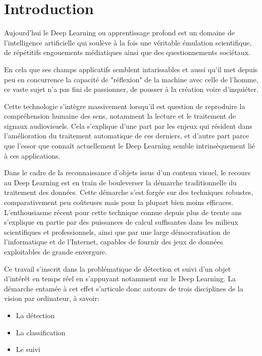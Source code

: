\section*{Introduction}
{}


	Aujourd’hui le Deep Learning ou apprentissage profond est un domaine de l’intelligence artificielle qui soulève à la fois une véritable émulation scientifique, de répétitifs engouements médiatiques \cite{Bib_mondepix} \cite{Bib_usinedigitale} \cite{Bib_silicon} ainsi que des questionnements sociétaux. 
	
	En cela que ses champs applicatifs semblent intarissables et aussi qu’il met depuis peu en concurrence la capacité de "réflexion" de la machine avec celle de l’homme, ce vaste sujet n’a pas fini de passionner, de pousser à la création voire d’inquiéter.  

	Cette technologie s’intègre massivement lorsqu’il est question de reproduire la compréhension humaine des sens, notamment la lecture et le traitement de signaux audiovisuels. Cela s’explique d’une part par les enjeux qui résident dans l’amélioration du traitement automatique de ces derniers, et d’autre part parce que l’essor que connaît actuellement le Deep Learning semble intrinsèquement lié à ces applications. 

	Dans le cadre de la reconnaissance d’objets issus d’un contenu visuel, le recours au Deep Learning est en train de bouleverser la démarche traditionnelle du traitement des données. Cette démarche s’est forgée sur des techniques robustes, comparativement peu coûteuses mais pour la plupart bien moins efficaces. L’enthousiasme récent pour cette technique connue depuis plus de trente ans s’explique en partie par des puissances de calcul suffisantes dans les milieux scientifiques et professionnels, ainsi que par une large démocratisation de l’informatique et de l’Internet, capables de fournir des jeux de données exploitables de grande envergure. 

	Ce travail s’inscrit dans la problématique de détection et suivi d’un objet d’intérêt en temps réel en s’appuyant notamment sur le Deep Learning. La démarche entamée à cet effet s’articule donc autours de trois  disciplines de la vision par ordinateur, à savoir:
	
	\begin{itemize}
		\item{La détection}
		\item{La classification}
		\item{Le suivi}
	\end{itemize}
	
